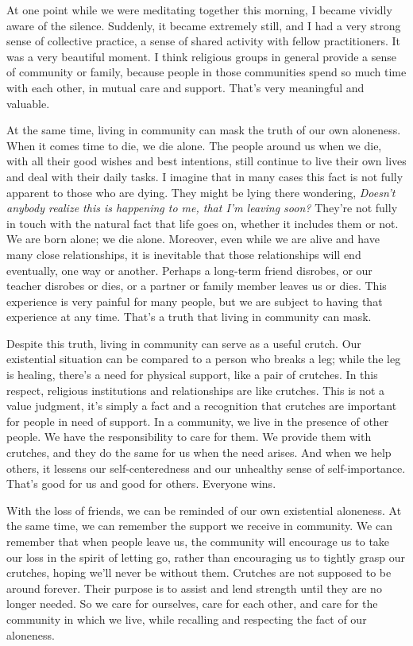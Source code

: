 
At one point while we were meditating together this morning, I became 
vividly aware of the silence. Suddenly, it became extremely still, and 
I had a very strong sense of collective practice, a sense of shared 
activity with fellow practitioners. It was a very beautiful moment. I 
think religious groups in general provide a sense of community or 
family, because people in those communities spend so much time with 
each other, in mutual care and support. That's very meaningful and 
valuable.

At the same time, living in community can mask the truth of our own 
aloneness. When it comes time to die, we die alone. The people around 
us when we die, with all their good wishes and best intentions, still 
continue to live their own lives and deal with their daily tasks. I 
imagine that in many cases this fact is not fully apparent to those who 
are dying. They might be lying there wondering, \emph{Doesn't anybody 
realize this is happening to me, that I'm leaving soon?} They're not 
fully in touch with the natural fact that life goes on, whether it 
includes them or not. We are born alone; we die alone. Moreover, even 
while we are alive and have many close relationships, it is inevitable 
that those relationships will end eventually, one way or another. 
Perhaps a long-term friend disrobes, or our teacher disrobes or dies, 
or a partner or family member leaves us or dies. This experience is 
very painful for many people, but we are subject to having that 
experience at any time. That's a truth that living in community can 
mask.

Despite this truth, living in community can serve as a useful crutch. 
Our existential situation can be compared to a person who breaks a leg; 
while the leg is healing, there's a need for physical support, like a 
pair of crutches. In this respect, religious institutions and 
relationships are like crutches. This is not a value judgment, it's 
simply a fact and a recognition that crutches are important for people 
in need of support. In a community, we live in the presence of other 
people. We have the responsibility to care for them. We provide them 
with crutches, and they do the same for us when the need arises. And 
when we help others, it lessens our self-centeredness and our unhealthy 
sense of self-importance. That's good for us and good for others. 
Everyone wins.

With the loss of friends, we can be reminded of our own existential 
aloneness. At the same time, we can remember the support we receive in 
community. We can remember that when people leave us, the community 
will encourage us to take our loss in the spirit of letting go, rather 
than encouraging us to tightly grasp our crutches, hoping we'll never 
be without them. Crutches are not supposed to be around forever. Their 
purpose is to assist and lend strength until they are no longer needed. 
So we care for ourselves, care for each other, and care for the 
community in which we live, while recalling and respecting the fact of 
our aloneness.

